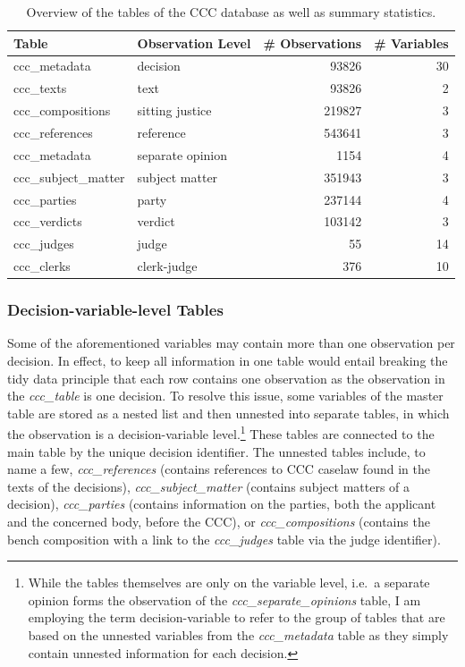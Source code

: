 \documentclass[
  11pt,
]{article}
\begin{document}
\begin{table}

\caption{\label{tab:skim}Overview of the tables of the CCC database as well as summary statistics.}
\centering
\begin{tabular}[t]{l|l|r|r}
\hline
Table & Observation Level & \# Observations & \# Variables\\
\hline
ccc\_metadata & decision & 93826 & 30\\
\hline
ccc\_texts & text & 93826 & 2\\
\hline
ccc\_compositions & sitting justice & 219827 & 3\\
\hline
ccc\_references & reference & 543641 & 3\\
\hline
ccc\_metadata & separate opinion & 1154 & 4\\
\hline
ccc\_subject\_matter & subject matter & 351943 & 3\\
\hline
ccc\_parties & party & 237144 & 4\\
\hline
ccc\_verdicts & verdict & 103142 & 3\\
\hline
ccc\_judges & judge & 55 & 14\\
\hline
ccc\_clerks & clerk-judge & 376 & 10\\
\hline
\end{tabular}
\end{table}

\subsubsection{Decision-variable-level Tables}\label{decision-variable-level-tables}

Some of the aforementioned variables may contain more than one observation per decision. In effect, to keep all information in one table would entail breaking the tidy data principle that each row contains one observation as the observation in the \emph{ccc\_table} is one decision. To resolve this issue, some variables of the master table are stored as a nested list and then unnested into separate tables, in which the observation is a decision-variable level.\footnote{While the tables themselves are only on the variable level, i.e.~a separate opinion forms the observation of the \emph{ccc\_separate\_opinions} table, I am employing the term decision-variable to refer to the group of tables that are based on the unnested variables from the \emph{ccc\_metadata} table as they simply contain unnested information for each decision.} These tables are connected to the main table by the unique decision identifier. The unnested tables include, to name a few, \emph{ccc\_references} (contains references to CCC caselaw found in the texts of the decisions), \emph{ccc\_subject\_matter} (contains subject matters of a decision), \emph{ccc\_parties} (contains information on the parties, both the applicant and the concerned body, before the CCC), or \emph{ccc\_compositions} (contains the bench composition with a link to the \emph{ccc\_judges} table via the judge identifier).
\end{document}

